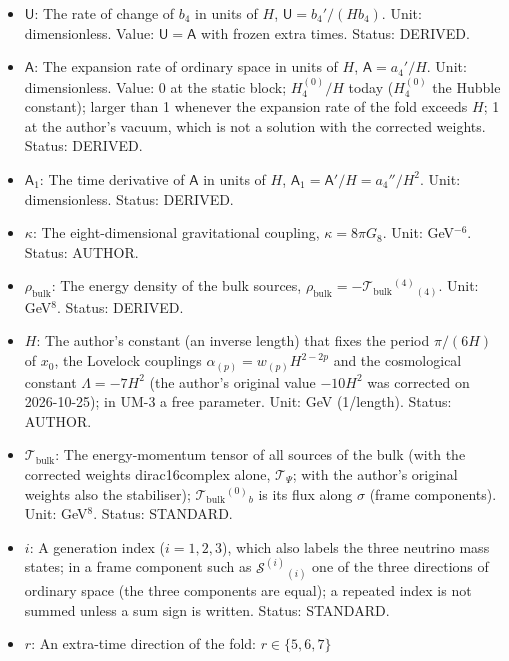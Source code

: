 \documentclass[
  10pt,
]{article}
\providecommand{\tightlist}{%
  \setlength{\itemsep}{0pt}\setlength{\parskip}{0pt}}
\begin{document}
\begin{itemize}
\tightlist
\item
  \(\mathsf{U}\): The rate of change of \(b_4\) in units of \(H\),
  \(\mathsf{U} = b_4'/(Hb_4)\). Unit: dimensionless. Value:
  \(\mathsf{U} = \mathsf{A}\) with frozen extra times. Status: DERIVED.
\item
  \(\mathsf{A}\): The expansion rate of ordinary space in units of
  \(H\), \(\mathsf{A} = a_4'/H\). Unit: dimensionless. Value: 0 at the
  static block; \(H_4^{(0)}/H\) today (\(H_4^{(0)}\) the Hubble
  constant); larger than 1 whenever the expansion rate of the fold
  exceeds \(H\); 1 at the author's vacuum, which is not a solution with
  the corrected weights. Status: DERIVED.
\item
  \(\mathsf{A}_1\): The time derivative of \(\mathsf{A}\) in units of
  \(H\), \(\mathsf{A}_1 = \mathsf{A}'/H = a_4''/H^2\). Unit:
  dimensionless. Status: DERIVED.
\item
  \(\kappa\): The eight-dimensional gravitational coupling,
  \(\kappa = 8\pi G_8\). Unit: GeV\(^{-6}\). Status: AUTHOR.
\item
  \(\rho_{\mathrm{bulk}}\): The energy density of the bulk sources,
  \(\rho_{\mathrm{bulk}} = -\mathcal{T}_{\mathrm{bulk}}{}^{(4)}{}_{(4)}\).
  Unit: GeV\(^8\). Status: DERIVED.
\item
  \(H\): The author's constant (an inverse length) that fixes the period
  \(\pi/(6H)\) of \(x_0\), the Lovelock couplings
  \(\alpha_{(p)} = w_{(p)}H^{2-2p}\) and the cosmological constant
  \(\Lambda = -7H^2\) (the author's original value \(-10H^2\) was
  corrected on 2026-10-25); in UM-3 a free parameter. Unit: GeV
  (1/length). Status: AUTHOR.
\item
  \(\mathcal{T}_{\mathrm{bulk}}\): The energy-momentum tensor of all
  sources of the bulk (with the corrected weights dirac16complex alone,
  \(\mathcal{T}_\Psi\); with the author's original weights also the
  stabiliser); \(\mathcal{T}_{\mathrm{bulk}}{}^{(0)}{}_b\) is its flux
  along \(\sigma\) (frame components). Unit: GeV\(^8\). Status:
  STANDARD.
\item
  \(i\): A generation index (\(i = 1, 2, 3\)), which also labels the
  three neutrino mass states; in a frame component such as
  \(\mathcal{S}^{(i)}{}_{(i)}\) one of the three directions of ordinary
  space (the three components are equal); a repeated index is not summed
  unless a sum sign is written. Status: STANDARD.
\item
  \(r\): An extra-time direction of the fold: \(r \in \{5, 6, 7\}\)

\end{itemize}
\end{document}

